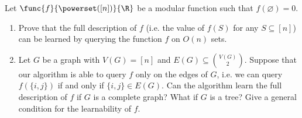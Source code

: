 \documentclass[a4paper, 12pt]{report}
\begin{document}
    \begin{framedprob}{}
        Let $\func{f}{\powerset ([n])}{\R}$ be a modular function such that $f(\varnothing) = 0$.

        \begin{enumerate}
            \item Prove that the full description of $f$ (i.e. the value of $f(S)$ for any $S \subseteq [n]$) can be learned by querying the function $f$ on $O(n)$ sets.
            \item Let $G$ be a graph with $V(G) = [n]$ and $E(G) \subseteq \binom{V(G)}{2}$. Suppose that our algorithm is able to query $f$ only on the edges of $G$, i.e. we can query $f(\{i, j\})$ if and only if $\{i, j\} \in E(G)$. Can the algorithm learn the full description of $f$ if $G$ is a complete graph? What if $G$ is a tree? Give a general condition for the learnability of $f$.
        \end{enumerate}
    \end{framedprob}
    
\end{document}
